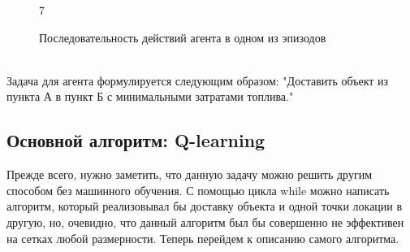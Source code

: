 \documentclass[12pt, a4paper]{report}
\theoremstyle{definition}
\theoremstyle{plain}
\theoremstyle{remark}
\theoremstyle{remark}
\theoremstyle{definition}
\begin{document}
\begin{figure}[h!]
\begin{minipage}[h!]{0.24\linewidth}
    \end{minipage}
    \begin{minipage}[h!]{0.24\linewidth}
         7\\
    \end{minipage}
    \caption{Последовательность действий агента в одном из эпизодов}
    \label{fig:my_label}
\end{figure}
\\
Задача для агента формулируется следующим образом: "Доставить объект из пункта А в пункт Б с минимальными затратами топлива."

\subsection{Основной алгоритм: Q-learning}

Прежде всего, нужно заметить, что данную задачу можно решить другим способом без машинного обучения. С помощью цикла while можно написать алгоритм, который реализовывал бы доставку объекта и одной точки локации в другую, но, очевидно, что данный алгоритм был бы совершенно не эффективен на сетках любой размерности. Теперь перейдем к описанию самого алгоритма. \\
\end{document}
